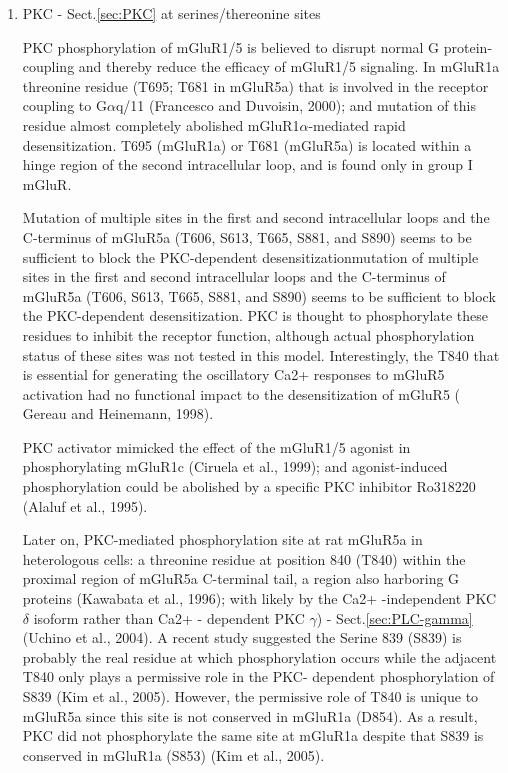 \begin{enumerate}
  \item PKC - Sect.\ref{sec:PKC} at serines/thereonine sites

PKC phosphorylation of mGluR1/5 is believed to disrupt normal G protein-coupling
and thereby reduce the efficacy of mGluR1/5 signaling.
In mGluR1a threonine residue (T695; T681 in mGluR5a) that is involved in the
receptor coupling to G$\alpha$q/11 (Francesco and Duvoisin, 2000); and mutation
of this residue almost completely abolished mGluR1$\alpha$-mediated rapid
desensitization. T695 (mGluR1a) or T681 (mGluR5a) is located within a hinge
region of the second intracellular loop, and is found only in group I mGluR.
  
Mutation of multiple sites in the first and second intracellular loops and the
C-terminus of mGluR5a (T606, S613, T665, S881, and S890) seems to be sufficient
to block the PKC-dependent desensitizationmutation of multiple sites in the
first and second intracellular loops and the C-terminus of mGluR5a (T606, S613,
T665, S881, and S890) seems to be sufficient to block the PKC-dependent
desensitization. PKC is thought to phosphorylate these residues to inhibit the
receptor function, although actual phosphorylation status of these sites was not
tested in this model. Interestingly, the T840 that is essential for generating
the oscillatory Ca2+ responses to mGluR5 activation had no functional impact to
the desensitization of mGluR5 ( Gereau and Heinemann, 1998).
  
PKC activator mimicked the effect of the mGluR1/5 agonist in phosphorylating
mGluR1c (Ciruela et al., 1999); and agonist-induced phosphorylation could be
abolished by a specific PKC inhibitor Ro318220 (Alaluf et al., 1995).

Later on,  PKC-mediated phosphorylation site at rat mGluR5a in heterologous
cells: a threonine residue at position 840 (T840) within the proximal region of
mGluR5a C-terminal tail, a region also harboring G proteins (Kawabata et al.,
1996); with likely by the Ca2+ -independent PKC $\delta$ isoform rather than
Ca2+ - dependent PKC $\gamma$) - Sect.\ref{sec:PLC-gamma} (Uchino et al., 2004).
A recent study suggested the Serine 839 (S839) is probably the real residue at
which phosphorylation occurs while the adjacent T840 only plays a permissive
role in the PKC- dependent phosphorylation of S839 (Kim et al., 2005).
However, the permissive role of T840 is unique to mGluR5a since this site is not
conserved in mGluR1a (D854). As a result, PKC did not phosphorylate the same
site at mGluR1a despite that S839 is conserved in mGluR1a (S853) (Kim et al.,
2005).



\end{enumerate}
